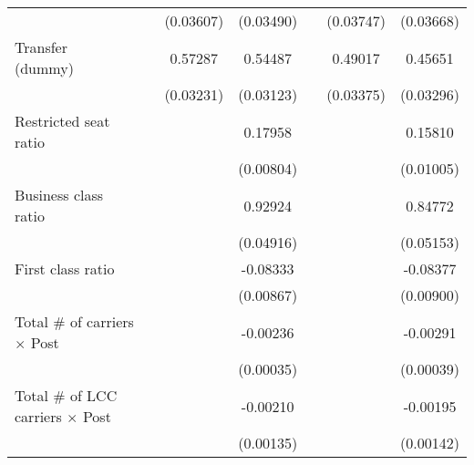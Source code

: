 \begin{table}[htbp]
\begin{tabular}{l*{6}{c}}
                    &                     &   (0.03607)         &   (0.03490)         &                     &   (0.03747)         &   (0.03668)         \\
\addlinespace
\shortstack{Transfer \\ (dummy)}&                     &     0.57287\sym{***}&     0.54487\sym{***}&                     &     0.49017\sym{***}&     0.45651\sym{***}\\
                    &                     &   (0.03231)         &   (0.03123)         &                     &   (0.03375)         &   (0.03296)         \\
\addlinespace
Restricted seat ratio&                     &                     &     0.17958\sym{***}&                     &                     &     0.15810\sym{***}\\
                    &                     &                     &   (0.00804)         &                     &                     &   (0.01005)         \\
\addlinespace
Business class ratio&                     &                     &     0.92924\sym{***}&                     &                     &     0.84772\sym{***}\\
                    &                     &                     &   (0.04916)         &                     &                     &   (0.05153)         \\
\addlinespace
First class ratio   &                     &                     &    -0.08333\sym{***}&                     &                     &    -0.08377\sym{***}\\
                    &                     &                     &   (0.00867)         &                     &                     &   (0.00900)         \\
\addlinespace
Total # of carriers $\times$ Post&                     &                     &    -0.00236\sym{***}&                     &                     &    -0.00291\sym{***}\\
                    &                     &                     &   (0.00035)         &                     &                     &   (0.00039)         \\
\addlinespace
Total # of LCC carriers $\times$ Post&                     &                     &    -0.00210         &                     &                     &    -0.00195         \\
                    &                     &                     &   (0.00135)         &                     &                     &   (0.00142)         \\

\end{tabular}
\end{table}
